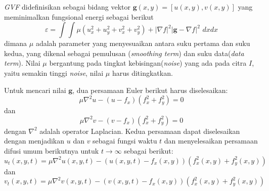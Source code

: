 \emph{GVF} didefinisikan sebagai bidang vektor $\textbf{g}(x,y) = [u(x,y), v(x,y)]$ yang meminimalkan fungsional energi sebagai berikut
\begin{equation}
	\label{equ_gvf}
	\varepsilon = \int \int \mu (u_x^2 + u_y^2 + v_x^2 + v_y^2) + |\nabla f|^2 |\textbf{g} - \nabla f|^2 \,\, dx dx
\end{equation}
dimana $\mu$ adalah parameter yang menyesuaikan antara suku pertama dan suku kedua, yang dikenal sebagai pemulusan (\emph{smoothing term}) dan  suku data(\emph{data term}). Nilai $\mu$ bergantung pada tingkat kebisingan(\emph{noise}) yang ada pada citra $I$, yaitu semakin tinggi \emph{noise}, nilai $\mu$ harus ditingkatkan\citep{CartasAyala2011GradientVF}.

Untuk mencari nilai $\textbf{g}$, dua persamaan Euler berikut harus diselesaikan:
\begin{equation}
	\label{equ_gvf_a1}
	\mu {\nabla}^2 u - (u - f_x) (f_x^2 + f_y^2) = 0
\end{equation}
dan
\begin{equation}
	\label{equ_gvf_a2}
	\mu {\nabla}^2 v - (v - f_x) (f_x^2 + f_y^2) = 0
\end{equation}
dengan ${\nabla}^2$ adalah operator Laplacian. Kedua persamaan dapat diselesaikan dengan menjadikan $u$ dan $v$ sebagai fungsi waktu $t$ dan menyelesaikan persamaan difusi umum berikutnya untuk $t \rightarrow \infty$ sebagai berikut:
\begin{equation}
	\label{equ_gvf_b1}
	u_t(x,y,t) = \mu {\nabla}^2 u(x,y,t) - (u(x,y,t) - f_x(x,y)) (f^2_x (x,y) + f_y^2(x,y))
\end{equation}
dan
\begin{equation}
	\label{equ_gvf_b2}
	v_t(x,y,t) = \mu {\nabla}^2 v(x,y,t) - (v(x,y,t) - f_x(x,y)) (f^2_x (x,y) + f_y^2(x,y))
\end{equation}

